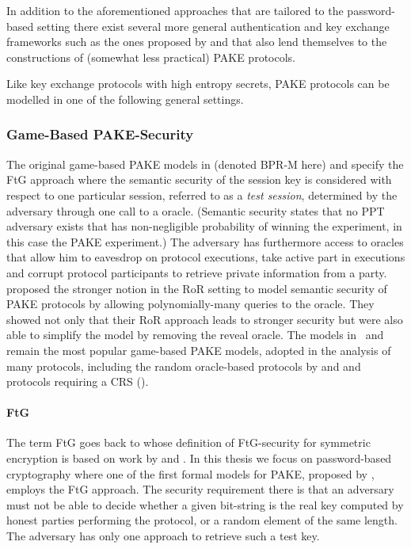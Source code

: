 In addition to the aforementioned approaches that are tailored to the password-based setting there exist several more general authentication and key exchange frameworks such as the ones proposed by \citet{Camenisch2010} and \citet{Blazy2012} that also lend themselves to the constructions of (somewhat less practical) \ac{PAKE} protocols.

Like key exchange protocols with high entropy secrets, \ac{PAKE} protocols can be modelled in one of the following general settings.

\subsubsection{Game-Based PAKE-Security}
The original game-based \ac{PAKE} models in \citet{Bellare2000} (denoted \ac{BPR-M} here) and \citet{Boyko2000} specify the \ac{FtG} approach where the semantic security of the session key is considered with respect to one particular session, referred to as a \emph{test session}, determined by the adversary through one call to a \Test oracle.
(Semantic security states that no \ac{PPT} adversary exists that has non-negligible probability of winning the experiment, in this case the \ac{PAKE} experiment.)
The adversary has furthermore access to oracles that allow him to eavesdrop on protocol executions, take active part in executions and corrupt protocol participants to retrieve private information from a party.
\citet{Abdalla2005} proposed the stronger notion in the \ac{RoR} setting to model semantic security of PAKE protocols by allowing polynomially-many queries to the \Test oracle.
They showed not only that their \ac{RoR} approach leads to stronger security but were also able to simplify the model by removing the reveal oracle.
The models in~\citet{Bellare2000} and \citet{Abdalla2005} remain the most popular game-based PAKE models, adopted in the analysis of many protocols, including the random oracle-based protocols by \citet{Abdalla2006} and \citet{Abdalla2005b} and protocols requiring a \ac{CRS} (\citet{KatzOY01,Gennaro2003,Gennaro2008,Katz2009a}).


\paragraph{\acl{FtG}}
The term \acl{FtG} goes back to \citet{Bellare97} whose definition of \ac{FtG}-security for symmetric encryption is based on work by \citet{Goldwasser84} and \citet{Micali86}.
In this thesis we focus on password-based cryptography where one of the first formal models for \ac{PAKE}, proposed by \citet{Bellare2000}, employs the \ac{FtG} approach.
The security requirement there is that an adversary must not be able to decide whether a given bit-string is the real key computed by honest parties performing the protocol, or a random element of the same length.
The adversary has only one approach to retrieve such a test key.

